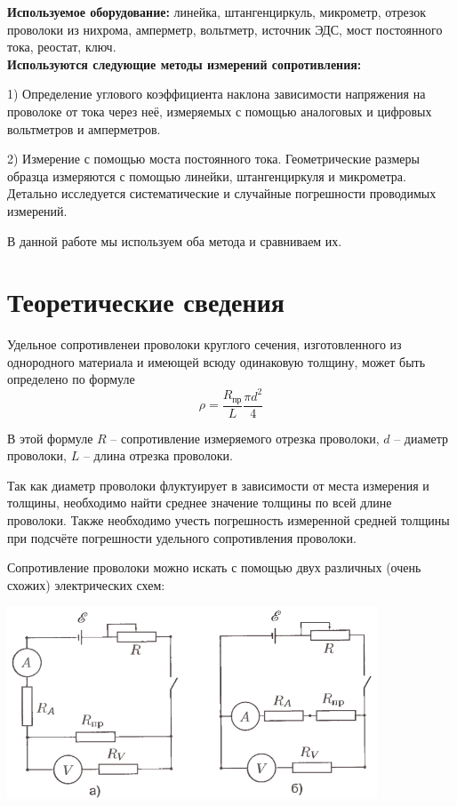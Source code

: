 \textbf{Используемое оборудование:} линейка, штангенциркуль, микрометр, отрезок проволоки из нихрома, амперметр, вольтметр, источник ЭДС, мост постоянного тока, реостат, ключ.\\

\textbf{Используются следующие методы измерений сопротивления:} 

1) Определение углового коэффициента наклона зависимости напряжения на проволоке от тока через неё, измеряемых с помощью аналоговых и цифровых вольтметров и амперметров.

2) Измерение с помощью моста постоянного тока. Геометрические размеры образца измеряются с помощью линейки, штангенциркуля и микрометра. Детально исследуется систематические и случайные погрешности проводимых измерений.

В данной работе мы используем оба метода и сравниваем их.\\


\section{Теоретические сведения}

Удельное сопротивленеи проволоки круглого сечения, изготовленного из однородного материала и имеющей всюду одинаковую толщину, может быть определено по формуле
\[\rho = \frac{R_{\text{пр}}}{L} \frac{\pi d^2}{4}\]

В этой формуле $R$ -- сопротивление измеряемого отрезка проволоки, $d$ -- диаметр проволоки, $L$ -- длина отрезка проволоки.

Так как диаметр проволоки флуктуирует в зависимости от места измерения и толщины, необходимо найти среднее значение толщины по всей длине проволоки. Также необходимо учесть погрешность измеренной средней толщины при подсчёте погрешности удельного сопротивления проволоки.

Сопротивление проволоки можно искать с помощью двух различных (очень схожих) электрических схем:
\begin{center}
    {\includegraphics[width=11cm]{1}}
\end{center}

